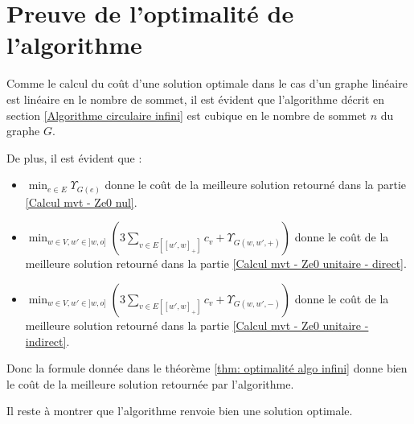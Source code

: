 \section{Preuve de l'optimalité de l'algorithme}

Comme le calcul du coût d'une solution optimale dans le cas d'un graphe linéaire est linéaire en le nombre de sommet, il est évident que l'algorithme décrit en section \ref{Algorithme circulaire infini} est cubique en le nombre de sommet $n$ du graphe $G$.

De plus, il est évident que :
\begin{itemize}
\item $\min_{e \in E} \Upsilon_{G(e)}$ donne le coût de la meilleure solution retourné dans la partie \ref{Calcul mvt - Ze0 nul}.
\item $\min_{w \in V, w' \in ]w,o]} \left(3 \sum_{ v \in E\left[ \left[w',w\right]_+ \right] }c_v + \Upsilon_{G(w,w',+)}\right)$ donne le coût de la meilleure solution retourné dans la partie \ref{Calcul mvt - Ze0 unitaire - direct}.
\item $\min_{w \in V, w' \in ]w,o]} \left(3 \sum_{ v \in E\left[ \left[w',w\right]_+ \right] }c_v + \Upsilon_{G(w,w',-)}\right)$ donne le coût de la meilleure solution retourné dans la partie \ref{Calcul mvt - Ze0 unitaire - indirect}.
\end{itemize}
Donc la formule donnée dans le théorème \ref{thm: optimalité algo infini} donne bien le coût de la meilleure solution retournée par l'algorithme.

Il reste à montrer que l'algorithme renvoie bien une solution optimale.